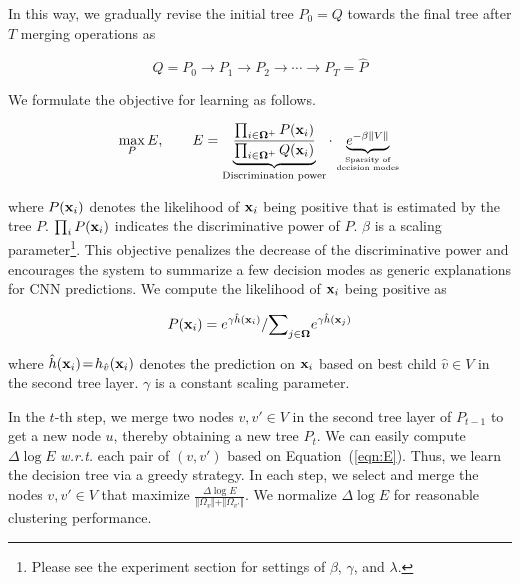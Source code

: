 \documentclass[10pt,twocolumn,letterpaper]{article}
\begin{document}
In this way, we gradually revise the initial tree $P_{0}=Q$ towards the final tree after $T$ merging operations as
\begin{small}
\begin{equation}
Q=P_{0}\rightarrow P_{1}\rightarrow P_{2}\rightarrow\cdots\rightarrow P_{T}=\hat{P}
\end{equation}
\end{small}

We formulate the objective for learning as follows.
\begin{small}
\begin{equation}
\max_{P}E,\qquad E=
\underbrace{\frac{\prod_{i\in{\boldsymbol\Omega}^{+}}P({\bf x}_{i})}{\prod_{i\in{\boldsymbol\Omega}^{+}}Q({\bf x}_{i})}}_{\textrm{Discrimination power}}\cdot
\underbrace{e^{-\beta\Vert V\Vert}}_{\textrm{Sparsity of}\atop\textrm{decision modes}}
\label{eqn:E}
\end{equation}
\end{small}
where $P({\bf x}_{i})$ denotes the likelihood of ${\bf x}_{i}$ being positive that is estimated by the tree $P$. {\small$\prod_{i}P({\bf x}_{i})$} indicates the discriminative power of $P$. $\beta$ is a scaling parameter\footnote[5]{Please see the experiment section for settings of $\beta$, $\gamma$, and $\lambda$.}. This objective penalizes the decrease of the discriminative power and encourages the system to summarize a few decision modes as generic explanations for CNN predictions. We compute the likelihood of ${\bf x}_{i}$ being positive as
\begin{small}
\begin{equation}
P({\bf x}_{i})={e^{\gamma\hat{h}({\bf x}_{i})}}/{{\sum}_{j\in{\boldsymbol\Omega}}e^{\gamma\hat{h}({\bf x}_{j})}}
\end{equation}
\end{small}
where {\small$\hat{h}({\bf x}_{i})\!=\!h_{\hat{v}}({\bf x}_{i})$} denotes the prediction on {\small${\bf x}_{i}$} based on best child $\hat{v}\in V$ in the second tree layer. $\gamma$ is a constant scaling parameter\footnotemark[5].


In the $t$-th step, we merge two nodes $v,v'\in V$ in the second tree layer of $P_{t-1}$ to get a new node $u$, thereby obtaining a new tree $P_{t}$. We can easily compute {\small$\Delta\log E$} \emph{w.r.t.} each pair of $(v,v')$ based on Equation~(\ref{eqn:E}). Thus, we learn the decision tree via a greedy strategy. In each step, we select and merge the nodes $v,v'\in V$ that maximize {\small$\frac{\Delta\log E}{\Vert\Omega_{v}\Vert+\Vert\Omega_{v'}\Vert}$}. We normalize {\small$\Delta\log E$} for reasonable clustering performance.
\end{document}
